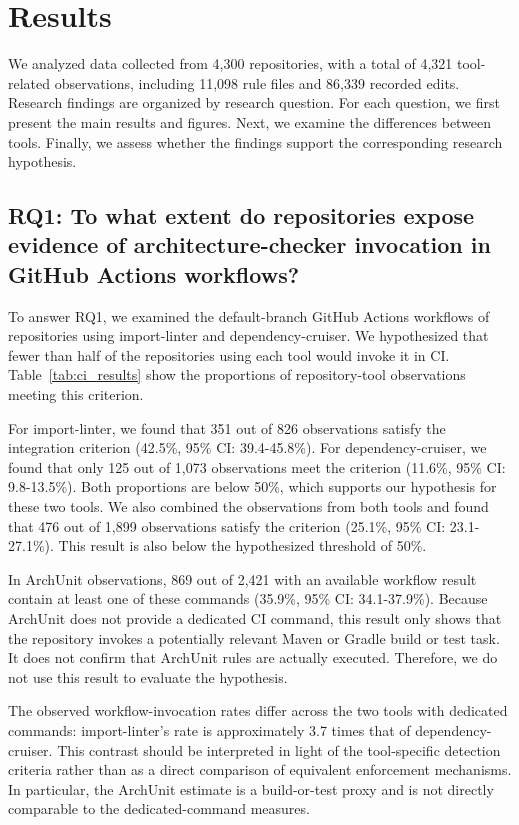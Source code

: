 \section{Results}
\label{sec:results}

We analyzed data collected from 4,300 repositories, with a total of 4,321 tool-related observations, including 11,098 rule files and 86,339 recorded edits.
Research findings are organized by research question. For each question, we first present the main results and figures. Next, we examine the differences between tools. Finally, we assess whether the findings support the corresponding research hypothesis.

\subsection{RQ1: To what extent do repositories expose evidence of architecture-checker invocation in GitHub Actions workflows?}
\label{sec:rq1}

To answer RQ1, we examined the default-branch GitHub Actions
workflows of repositories using import-linter and
dependency-cruiser. We hypothesized that fewer than half of the
repositories using each tool would invoke it in CI.
Table~\ref{tab:ci_results} show
the proportions of repository-tool observations meeting this
criterion.

For import-linter, we found that 351 out of 826 observations satisfy
the integration criterion (42.5\%, 95\% CI: 39.4-45.8\%). For
dependency-cruiser, we found that only 125 out of 1,073 observations
meet the criterion (11.6\%, 95\% CI: 9.8-13.5\%). Both proportions
are below 50\%, which supports our hypothesis for these two tools.
We also combined the observations from both tools and found that
476 out of 1,899 observations satisfy the criterion (25.1\%, 95\%
CI: 23.1-27.1\%). This result is also below the hypothesized
threshold of 50\%.

In ArchUnit observations, 869 out of 2,421 with an available workflow result contain at least one
of these commands (35.9\%, 95\% CI: 34.1-37.9\%). Because ArchUnit
does not provide a dedicated CI command, this result only shows that
the repository invokes a potentially relevant Maven or Gradle build
or test task. It does not confirm that ArchUnit rules are actually
executed. Therefore, we do not use this result to evaluate the hypothesis.

The observed workflow-invocation rates differ across the two tools
with dedicated commands: import-linter's rate is approximately
3.7 times that of dependency-cruiser. This contrast should be
interpreted in light of the tool-specific detection criteria rather
than as a direct comparison of equivalent enforcement mechanisms.
In particular, the ArchUnit estimate is a build-or-test proxy and
is not directly comparable to the dedicated-command measures.

